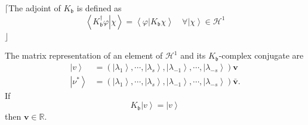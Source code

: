 \documentclass[aps,preprint]{revtex4}%
\begin{document}
$\lceil$The adjoint of $K_{\mathfrak{b}}$ is defined as
\begin{equation}
\left\langle \left.  K_{\mathfrak{b}}^{\dagger}\varphi\right\vert
\chi\right\rangle =\left\langle \left.  \varphi\right\vert K_{\mathfrak{b}%
}\chi\right\rangle \quad\forall\left\vert \chi\right\rangle \in\mathcal{H}^{1}%
\end{equation}
$\rfloor$

The matrix representation of an element of $\mathcal{H}^{1}$ and its
$K_{\mathfrak{b}}$-complex conjugate are
\begin{align}
\left\vert v\right\rangle  &  =\left(  \left\vert \lambda_{1}\right\rangle
,\cdots,\left\vert \lambda_{s}\right\rangle ,\left\vert \lambda_{-1}%
\right\rangle ,\cdots,\left\vert \lambda_{-s}\right\rangle \right)
\mathbf{v}\nonumber\\
\left\vert \nu^{\ast}\right\rangle  &  =\left(  \left\vert \lambda
_{1}\right\rangle ,\cdots,\left\vert \lambda_{s}\right\rangle ,\left\vert
\lambda_{-1}\right\rangle ,\cdots,\left\vert \lambda_{-s}\right\rangle
\right)  \mathbf{\bar{v}.}%
\end{align}
If
\begin{equation}
K_{\mathfrak{b}}\left\vert v\right\rangle =\left\vert v\right\rangle
\end{equation}
then $\mathbf{v\in}\mathbb{R}.$
\end{document}
